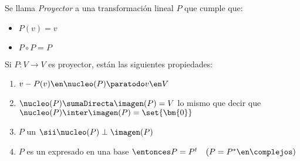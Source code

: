 \begin{enumerate}[label=\tiny\purple{\faIcon{snowman}}]
        Se llama  \textit{Proyector} a una transformación lineal $P$ que cumple que:
        \begin{itemize}
          \item $P(v) = v$
          \item $P \circ P = P$
        \end{itemize}
        Si $P: V \to V$ es proyector, están las siguientes propiedades:
        \begin{enumerate}[label=\poo]
          \item $v - P(v) \en \nucleo(P) \paratodo v \en V$
          \item  $ \nucleo(P) \sumaDirecta \imagen(P) = V$
                lo mismo que decir que
                $\nucleo(P) \inter \imagen(P) = \set{\bm{0}}$
          \item $P$ un \textit{}
                $\sii \nucleo(P) \perp \imagen(P)$
          \item $P$ es un \textit{} expresado en una base \textit{}
                $\entonces P = P^t \quad (P = P^* \en \complejos)$


\end{enumerate}
\end{enumerate}
